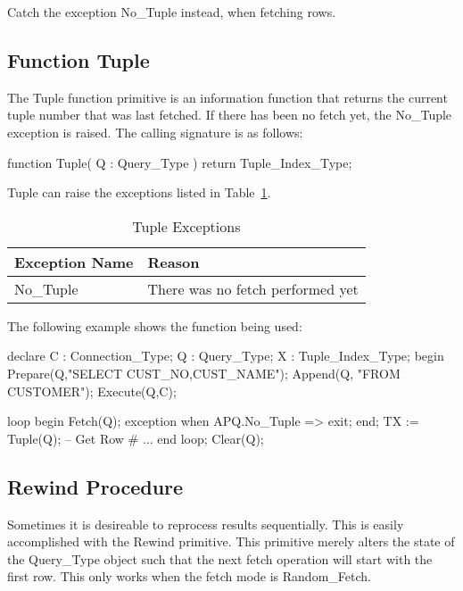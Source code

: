 \documentclass[english,letterpaper]{book}
\begin{document}
Catch the exception No\_Tuple instead, when fetching rows.


\subsection{Function Tuple}

The Tuple function primitive is an information function that
returns the current tuple number that was last
fetched. If there has been no fetch yet, the No\_Tuple exception
is raised. The calling signature is as follows:

\begin{Code}
function Tuple(
   Q : Query_Type
) return Tuple_Index_Type;
\end{Code}

Tuple can raise the exceptions listed in Table~\ref{t:tupx}.

\begin{table}
   \begin{center}
      \begin{tabular}{ll}
         Exception Name    &  Reason\\
         \hline 
         No\_Tuple         &  There was no fetch performed yet\\
      \end{tabular}
   \end{center}
   \caption{Tuple Exceptions}\label{t:tupx}
\end{table}

The following example shows the function being used:

\begin{Example}
declare
   C : Connection_Type;
   Q : Query_Type;
   X : Tuple_Index_Type;
begin
   Prepare(Q,"SELECT CUST_NO,CUST_NAME");
   Append(Q, "FROM CUSTOMER");
   Execute(Q,C);

   loop
      begin
         Fetch(Q);
      exception
         when APQ.No_Tuple =>
            exit;
      end;
      TX := Tuple(Q); -- Get Row #
      ...
   end loop;
   Clear(Q);
\end{Example}

\subsection{Rewind Procedure}

Sometimes it is desireable to reprocess results sequentially. This
is easily accomplished with the Rewind primitive. This
primitive merely alters the state of the Query\_Type object such that
the next fetch operation will start with the first row. This only
works when the fetch mode is Random\_Fetch.
\end{document}
